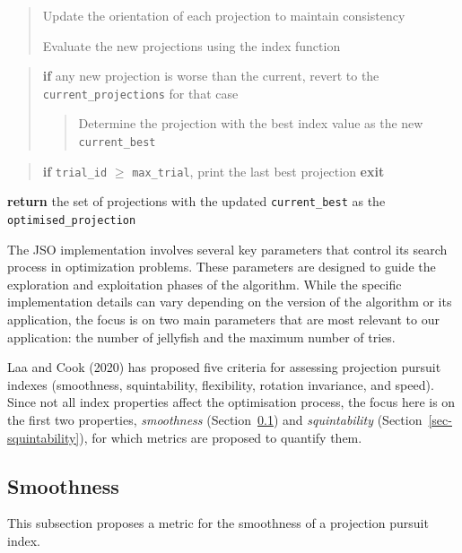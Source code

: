 \documentclass[
  12pt,
]{interact}
\theoremstyle{plain}
\begin{document}
\begin{tcolorbox}
\begin{quote}
Update the orientation of each projection to maintain consistency

Evaluate the new projections using the index function
\end{quote}

\begin{quote}
\textbf{if} any new projection is worse than the current, revert to the
\texttt{current\_projections} for that case

\begin{quote}
Determine the projection with the best index value as the new
\texttt{current\_best}
\end{quote}
\end{quote}

\begin{quote}
\textbf{if} \texttt{trial\_id} \(\ge\) \texttt{max\_trial}, print the
last best projection \textbf{exit}
\end{quote}

\textbf{return} the set of projections with the updated
\texttt{current\_best} as the \texttt{optimised\_projection}

\end{tcolorbox}

The JSO implementation involves several key parameters that control its
search process in optimization problems. These parameters are designed
to guide the exploration and exploitation phases of the algorithm. While
the specific implementation details can vary depending on the version of
the algorithm or its application, the focus is on two main parameters
that are most relevant to our application: the number of jellyfish and
the maximum number of tries.

Laa and Cook (2020) has proposed five criteria for assessing projection
pursuit indexes (smoothness, squintability, flexibility, rotation
invariance, and speed). Since not all index properties affect the
optimisation process, the focus here is on the first two properties,
\emph{smoothness} (Section~\ref{sec-smoothness}) and
\emph{squintability} (Section~\ref{sec-squintability}), for which
metrics are proposed to quantify them.

\hypertarget{sec-smoothness}{%
\subsection{Smoothness}\label{sec-smoothness}}

This subsection proposes a metric for the smoothness of a projection
pursuit index.
\end{document}
